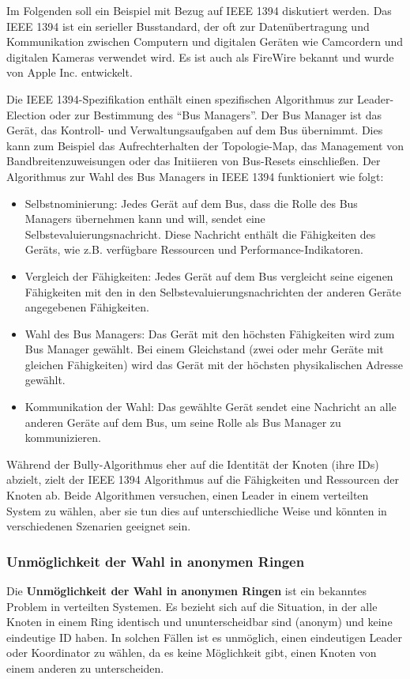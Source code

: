 Im Folgenden soll ein Beispiel mit Bezug auf IEEE 1394 diskutiert werden. Das IEEE 1394 ist ein serieller Busstandard, der oft zur Datenübertragung und Kommunikation zwischen Computern und digitalen Geräten wie Camcordern und digitalen Kameras verwendet wird. Es ist auch als FireWire bekannt und wurde von Apple Inc. entwickelt.

Die IEEE 1394-Spezifikation enthält einen spezifischen Algorithmus zur Leader-Election oder zur Bestimmung des \enquote{Bus Managers}. Der Bus Manager ist das Gerät, das Kontroll- und Verwaltungsaufgaben auf dem Bus übernimmt. Dies kann zum Beispiel das Aufrechterhalten der Topologie-Map, das Management von Bandbreitenzuweisungen oder das Initiieren von Bus-Resets einschließen. Der Algorithmus zur Wahl des Bus Managers in IEEE 1394 funktioniert wie folgt:
\begin{itemize}
\item Selbstnominierung: Jedes Gerät auf dem Bus, dass die Rolle des Bus Managers übernehmen kann und will, sendet eine Selbstevaluierungsnachricht. Diese Nachricht enthält die Fähigkeiten des Geräts, wie z.B. verfügbare Ressourcen und Performance-Indikatoren.
\item Vergleich der Fähigkeiten: Jedes Gerät auf dem Bus vergleicht seine eigenen Fähigkeiten mit den in den Selbstevaluierungsnachrichten der anderen Geräte angegebenen Fähigkeiten.
\item Wahl des Bus Managers: Das Gerät mit den höchsten Fähigkeiten wird zum Bus Manager gewählt. Bei einem Gleichstand (zwei oder mehr Geräte mit gleichen Fähigkeiten) wird das Gerät mit der höchsten physikalischen Adresse gewählt.
\item Kommunikation der Wahl: Das gewählte Gerät sendet eine Nachricht an alle anderen Geräte auf dem Bus, um seine Rolle als Bus Manager zu kommunizieren.
\end{itemize}
Während der  Bully-Algorithmus eher auf die Identität der Knoten (ihre IDs) abzielt, zielt der IEEE 1394 Algorithmus auf die Fähigkeiten und Ressourcen der Knoten ab. Beide Algorithmen versuchen, einen Leader in einem verteilten System zu wählen, aber sie tun dies auf unterschiedliche Weise und könnten in verschiedenen Szenarien geeignet sein.
\subsubsection{Unmöglichkeit der Wahl in anonymen Ringen}
Die \textbf{Unmöglichkeit der Wahl in anonymen Ringen} ist ein bekanntes Problem in verteilten Systemen. Es bezieht sich auf die Situation, in der alle Knoten in einem Ring identisch und ununterscheidbar sind (anonym) und keine eindeutige ID haben. In solchen Fällen ist es unmöglich, einen eindeutigen Leader oder Koordinator zu wählen, da es keine Möglichkeit gibt, einen Knoten von einem anderen zu unterscheiden.

